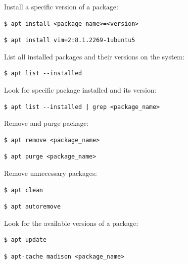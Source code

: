 \documentclass{article}
\newenvironment{codetemplate}[1][]{%
  \mybasecolorbox[#1]
  \itshape
}{%
  \endmybasecolorbox
}
\begin{document}
Install a specific version of a package:
\begin{codetemplate}
\begin{verbatim}
$ apt install <package_name>=<version>
\end{verbatim}
\end{codetemplate}
\begin{codetemplate}
\begin{verbatim}
$ apt install vim=2:8.1.2269-1ubuntu5
\end{verbatim}
\end{codetemplate}

List all installed packages and their versions on the system:
\begin{codetemplate}
\begin{verbatim}
$ apt list --installed
\end{verbatim}
\end{codetemplate}

Look for specific package installed and its version:
\begin{codetemplate}
\begin{verbatim}
$ apt list --installed | grep <package_name>
\end{verbatim}
\end{codetemplate}

Remove and purge package:
\begin{codetemplate}
\begin{verbatim}
$ apt remove <package_name>
\end{verbatim}
\end{codetemplate}
\begin{codetemplate}
\begin{verbatim}
$ apt purge <package_name>
\end{verbatim}
\end{codetemplate}

Remove unnecessary packages:
\begin{codetemplate}
\begin{verbatim}
$ apt clean
\end{verbatim}
\end{codetemplate}
\begin{codetemplate}
\begin{verbatim}
$ apt autoremove
\end{verbatim}
\end{codetemplate}

Look for the available versions of a package:
\begin{codetemplate}
\begin{verbatim}
$ apt update
\end{verbatim}
\end{codetemplate}
\begin{codetemplate}
\begin{verbatim}
$ apt-cache madison <package_name>
\end{verbatim}
\end{codetemplate}
\end{document}
